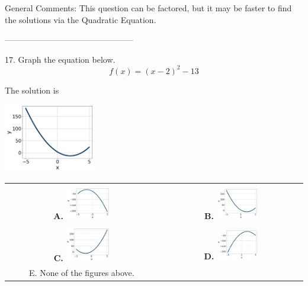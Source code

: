 \documentclass{extbook}[14pt]
\begin{document}
General Comments: This question can be factored, but it may be faster to find the solutions via the Quadratic Equation.

-----------------------------------------------

17. Graph the equation below.
\[ f(x) = (x-2)^2 - 13 \] 

 
 The solution is  
 \begin{center} \includegraphics[width=0.3\textwidth]{../Figures/quadraticEquationToGraphBA.png} \end{center}\begin{tabular}{|c|c|} 
\hline 
 & \tabularnewline 
 \textbf{A.} \includegraphics[width=0.3\textwidth]{../Figures/quadraticEquationToGraphAA.png} & \textbf{B.} \includegraphics[width=0.3\textwidth]{../Figures/quadraticEquationToGraphBA.png} \tabularnewline 
\hline 
 & \tabularnewline 
 \textbf{C.} \includegraphics[width=0.3\textwidth]{../Figures/quadraticEquationToGraphCA.png} & \textbf{D.} \includegraphics[width=0.3\textwidth]{../Figures/quadraticEquationToGraphDA.png} \tabularnewline 
\hline 
 E. None of the figures above. & \tabularnewline 
\hline 
 \end{tabular} 
 
\end{document}
